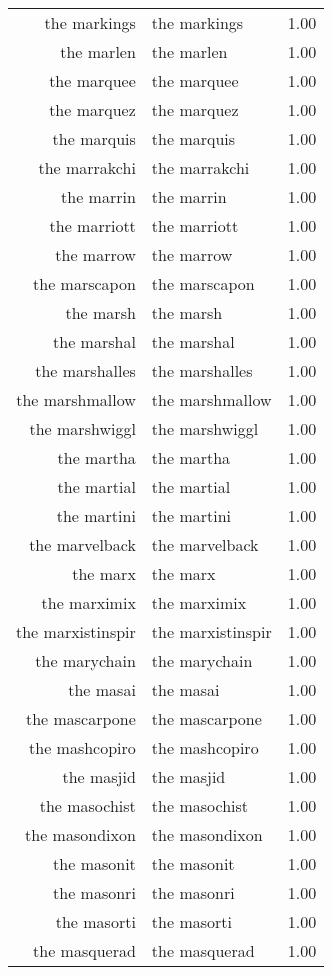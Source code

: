 \begin{table}[ht]
\begin{tabular}{rlr}
  the markings & the markings & 1.00 \\ 
  the marlen & the marlen & 1.00 \\ 
  the marquee & the marquee & 1.00 \\ 
  the marquez & the marquez & 1.00 \\ 
  the marquis & the marquis & 1.00 \\ 
  the marrakchi & the marrakchi & 1.00 \\ 
  the marrin & the marrin & 1.00 \\ 
  the marriott & the marriott & 1.00 \\ 
  the marrow & the marrow & 1.00 \\ 
  the marscapon & the marscapon & 1.00 \\ 
  the marsh & the marsh & 1.00 \\ 
  the marshal & the marshal & 1.00 \\ 
  the marshalles & the marshalles & 1.00 \\ 
  the marshmallow & the marshmallow & 1.00 \\ 
  the marshwiggl & the marshwiggl & 1.00 \\ 
  the martha & the martha & 1.00 \\ 
  the martial & the martial & 1.00 \\ 
  the martini & the martini & 1.00 \\ 
  the marvelback & the marvelback & 1.00 \\ 
  the marx & the marx & 1.00 \\ 
  the marximix & the marximix & 1.00 \\ 
  the marxistinspir & the marxistinspir & 1.00 \\ 
  the marychain & the marychain & 1.00 \\ 
  the masai & the masai & 1.00 \\ 
  the mascarpone & the mascarpone & 1.00 \\ 
  the mashcopiro & the mashcopiro & 1.00 \\ 
  the masjid & the masjid & 1.00 \\ 
  the masochist & the masochist & 1.00 \\ 
  the masondixon & the masondixon & 1.00 \\ 
  the masonit & the masonit & 1.00 \\ 
  the masonri & the masonri & 1.00 \\ 
  the masorti & the masorti & 1.00 \\ 
  the masquerad & the masquerad & 1.00 \\ 

\end{tabular}
\end{table}
